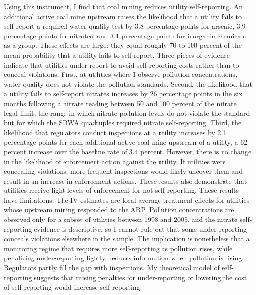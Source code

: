 \documentclass[12pt]{article}
\begin{document}
Using this instrument, I find that coal mining reduces utility self-reporting. An additional active coal mine upstream raises the likelihood that a utility fails to self-report a required water quality test by 3.8 percentage points for arsenic, 3.9 percentage points for nitrates, and 3.1 percentage points for inorganic chemicals as a group. These effects are large: they equal roughly 70 to 100 percent of the mean probability that a utility fails to self-report. Three pieces of evidence indicate that utilities under-report to avoid self-reporting costs rather than to conceal violations. First, at utilities where I observe pollution concentrations, water quality does not violate the pollution standards. Second, the likelihood that a utility fails to self-report nitrates increases by 26 percentage points in the six months following a nitrate reading between 50 and 100 percent of the nitrate legal limit, the range in which nitrate pollution levels do not violate the standard but for which the SDWA quadruples required nitrate self-reporting. Third, the likelihood that regulators conduct inspections at a utility increases by 2.1 percentage points for each additional active coal mine upstream of a utility, a 62 percent increase over the baseline rate of 3.4 percent. However, there is no change in the likelihood of enforcement action against the utility. If utilities were concealing violations, more frequent inspections would likely uncover them and result in an increase in enforcement actions. These results also demonstrate that utilities receive light levels of enforcement for not self-reporting. These results have limitations. The IV estimates are local average treatment effects for utilities whose upstream mining responded to the ARP. Pollution concentrations are observed only for a subset of utilities between 1998 and 2005, and the nitrate self-reporting evidence is descriptive, so I cannot rule out that some under-reporting conceals violations elsewhere in the sample. The implication is nonetheless that a monitoring regime that requires more self-reporting as pollution rises, while penalizing under-reporting lightly, reduces information when pollution is rising. Regulators partly fill the gap with inspections. My theoretical model of self-reporting suggests that raising penalties for under-reporting or lowering the cost of self-reporting would increase self-reporting.
\end{document}
